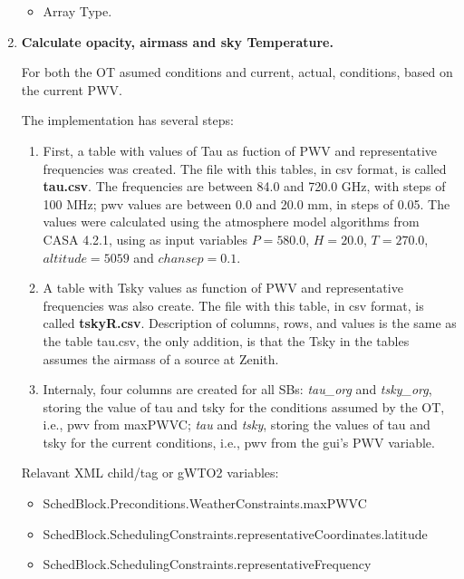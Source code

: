 \documentclass[a4paper,10pt,english]{sphinxmanual}
\begin{document}
\begin{enumerate}
\begin{itemize}
\item {} 
Array Type.

\end{itemize}

\item {} 
\textbf{Calculate opacity, airmass and sky Temperature.}

For both the OT asumed conditions and current, actual, conditions,
based on the current PWV.

The implementation has several steps:
\begin{enumerate}
\item {} 
First, a table with values of Tau as fuction of PWV and representative
frequencies was created. The file with this tables, in csv format, is
called \textbf{tau.csv}. The frequencies are between 84.0 and 720.0 GHz, with
steps of 100 MHz; pwv values are between 0.0 and 20.0 mm, in steps of
0.05. The values were calculated using the atmosphere model algorithms from
CASA 4.2.1, using as input variables \(P=580.0\), \(H=20.0\),
\(T=270.0\), \(altitude=5059\) and \(chansep=0.1\).

\item {} 
A table with Tsky values as function of PWV and representative
frequencies was also create. The file with this table, in csv format,
is called \textbf{tskyR.csv}. Description of columns, rows, and values is the
same as the table tau.csv, the only addition, is that the Tsky in the
tables assumes the airmass of a source at Zenith.

\item {} 
Internaly, four columns are created for all SBs: \emph{tau\_org} and \emph{tsky\_org},
storing the value of tau and tsky for the conditions assumed by the OT,
i.e., pwv from maxPWVC; \emph{tau} and \emph{tsky}, storing
the values of tau and tsky for the current conditions, i.e.,
pwv from the gui's PWV variable.

\end{enumerate}

Relavant XML child/tag or gWTO2 variables:
\begin{itemize}
\item {} 
SchedBlock.Preconditions.WeatherConstraints.maxPWVC

\item {} 
SchedBlock.SchedulingConstraints.representativeCoordinates.latitude

\item {} 
SchedBlock.SchedulingConstraints.representativeFrequency


\end{itemize}
\end{enumerate}
\end{document}
